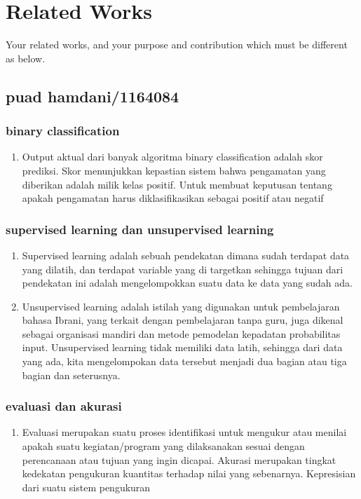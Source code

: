 \chapter{Related Works}

Your related works, and your purpose and contribution which must be different as below.


\section{puad hamdani/1164084}
\subsection{binary classification }
\begin{enumerate}
\item Output aktual dari banyak algoritma binary classification adalah skor prediksi. Skor menunjukkan kepastian sistem bahwa pengamatan yang diberikan adalah milik kelas positif. Untuk membuat keputusan tentang apakah pengamatan harus diklasifikasikan sebagai positif atau negatif
\end{enumerate}

\subsection{supervised learning dan unsupervised learning}
\begin{enumerate}
\item Supervised learning adalah sebuah pendekatan dimana sudah terdapat data yang dilatih, dan terdapat variable yang di targetkan sehingga tujuan dari pendekatan ini adalah mengelompokkan suatu data ke data yang sudah ada.


\item Unsupervised learning adalah istilah yang digunakan untuk pembelajaran bahasa Ibrani, yang terkait dengan pembelajaran tanpa guru, juga dikenal sebagai organisasi mandiri dan metode pemodelan kepadatan probabilitas input. Unsupervised learning tidak memiliki data latih, sehingga dari data yang ada, kita mengelompokan data tersebut menjadi dua bagian atau tiga bagian dan seterusnya.
\end{enumerate}

\subsection{evaluasi dan akurasi }
\begin{enumerate}
\item Evaluasi merupakan suatu proses identifikasi untuk mengukur atau menilai apakah suatu kegiatan/program yang dilaksanakan sesuai dengan perencanaan atau tujuan yang ingin dicapai.
Akurasi merupakan tingkat kedekatan pengukuran kuantitas terhadap nilai yang sebenarnya. Kepresisian dari suatu sistem pengukuran
\end{enumerate}

